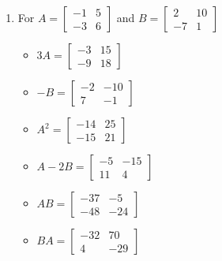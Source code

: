 \documentclass{ximera}
\begin{document}
\begin{enumerate}
\begin{multicols}{3}
\begin{itemize}
\end{itemize}
\end{multicols}



\item For  $A = \left[ \begin{array}{rr} -1 & 5 \\ -3 & 6 \end{array} \right]$ and $B=\left[ \begin{array}{rr} 2 & 10 \\ -7 & 1 \end{array} \right]$

\begin{multicols}{3}
\begin{itemize}
\item  $3A = \left[ \begin{array}{rr} -3 & 15 \\ -9 & 18 \end{array} \right]$

\item $-B = \left[ \begin{array}{rr} -2 & -10 \\ 7 & -1 \end{array} \right]$

\item $A^2 = \left[ \begin{array}{rr} -14 & 25 \\ -15 & 21 \end{array} \right]$

\end{itemize}
\end{multicols}


\begin{multicols}{3}
\begin{itemize}
\item  $A-2B = \left[ \begin{array}{rr} -5 & -15 \\ 11 & 4 \end{array} \right]$

\item $AB = \left[ \begin{array}{rr} -37 & -5 \\ -48 & -24 \end{array} \right]$

\item $BA = \left[ \begin{array}{rr} -32 & 70 \\ 4 & -29 \end{array} \right]$


\end{itemize}
\end{multicols}
\end{enumerate}
\end{document}
